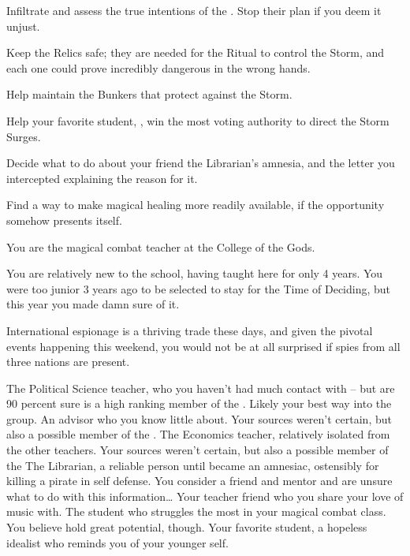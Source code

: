\documentclass[char]{GL2020}
\begin{document}
\begin{itemz}
	\item Infiltrate and assess the true intentions of the \pGoaties{}. Stop their plan if you deem it unjust.
	\item Keep the Relics safe; they are needed for the Ritual to control the Storm, and each one could prove incredibly dangerous in the wrong hands.
	\item Help \cBunker{} maintain the Bunkers that protect against the Storm.
	\item Help your favorite student, \cDisney{}, win the most voting authority to direct the Storm Surges.
\item Decide what to do about your friend the Librarian's amnesia, and the letter you intercepted explaining the reason for it.
	\item Find a way to make magical healing more readily available, if the opportunity somehow presents itself.
\end{itemz}

\begin{itemz}[Notes]
	\item You are the magical combat teacher at the College of the Gods.
	\item You are relatively new to the school, having taught here for only 4 years. You were too junior 3 years ago to be selected to stay for the Time of Deciding, but this year you made damn sure of it.
	\item International espionage is a thriving trade these days, and given the pivotal events happening this weekend, you would not be at all surprised if spies from all three nations are present. 
\end{itemz}

\begin{contacts}
	\contact{\cChupInventor{}} The Political Science teacher, who you haven't had much contact with -- but are 90 percent sure is a high ranking member of the \pGoaties{}. Likely your best way into the group.
\contact{\cWildCard{}} An advisor who you know little about. Your sources weren't certain, but also a possible member of the \pGoaties{}. 
	\contact{\cChupSecond{}} The Economics teacher, relatively isolated from the other teachers. Your sources weren't certain, but also a possible member of the \pGoaties{}
	\contact{\cLibrarian{}} The Librarian, a reliable person until \cLibrarian{\they} became an amnesiac, ostensibly for killing a pirate in self defense. You consider \cLibrarian{\them} a friend and mentor and are unsure what to do with this information\ldots 
	\contact{\cMusic{}} Your teacher friend who you share your love of music with.
	\contact{\cAdopted{}} The student who struggles the most in your magical combat class. You believe \cAdopted{\they} hold great potential, though.
	\contact{\cDisney{}} Your favorite student, a hopeless idealist who reminds you of your younger self. 
\end{contacts}
\end{document}
